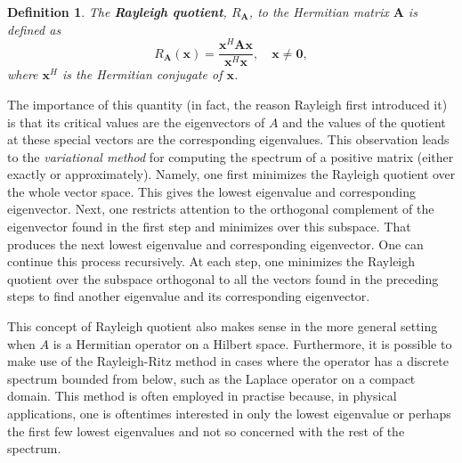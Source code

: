 \documentclass[12pt]{article}
\newcommand{\mv}[1]{\mathbf{#1}}
\newtheorem*{defn}{Definition}
\begin{document}
\begin{defn} The {\bf Rayleigh quotient}, $R_{\mv{A}}$, to the Hermitian matrix $\mv{A}$ is defined as \\
\begin{displaymath}
R_{\mv{A}}(\mv{x})=\frac{\mv{x}^H \mv{A} \mv{x}}{\mv{x}^H \mv{x}}, \quad \mv{x}\neq \mv{0},
\end{displaymath}where $\mv{x}^H$ is the Hermitian conjugate of $\mv{x}$.
\end{defn}

The importance of this quantity (in fact, the reason Rayleigh first 
introduced it) is that its critical values are the eigenvectors
of $A$ and the values of the quotient at these special vectors are the
corresponding eigenvalues.  This observation leads to the \emph{variational 
method} for computing the spectrum of a positive matrix (either exactly or
approximately).  Namely, one first minimizes the Rayleigh quotient over the
whole vector space.  This gives the lowest eigenvalue and corresponding
eigenvector.  Next, one restricts attention to the orthogonal complement
of the eigenvector found in the first step and minimizes over this subspace.
That produces the next lowest eigenvalue and corresponding eigenvector.  One
can continue this process recursively.  At each step, one minimizes the 
Rayleigh quotient over the subspace orthogonal to all the vectors found in 
the preceding steps to find another eigenvalue and its corresponding 
eigenvector.

This concept of Rayleigh quotient also makes sense in the more general 
setting when $A$ is a Hermitian operator on a Hilbert space.  Furthermore,
it is possible to make use of the Rayleigh-Ritz method in cases where the
operator has a discrete spectrum bounded from below, such as the Laplace
operator on a compact domain.  This method is often employed in practise
because, in physical applications, one is oftentimes interested in only the 
lowest eigenvalue or perhaps the first few lowest eigenvalues and not so
concerned with the rest of the spectrum.
\end{document}
